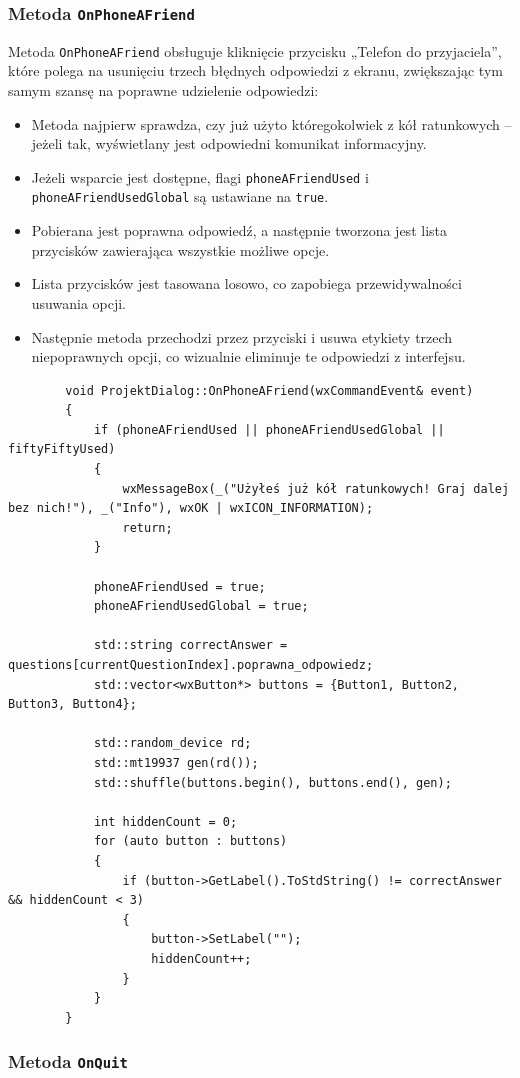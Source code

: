 \documentclass[]{article}
\begin{document}
\subsubsection{Metoda \texttt{OnPhoneAFriend}}

Metoda \texttt{OnPhoneAFriend} obsługuje kliknięcie przycisku „Telefon do przyjaciela”, które polega na usunięciu trzech błędnych odpowiedzi z ekranu, zwiększając tym samym szansę na poprawne udzielenie odpowiedzi:
\begin{itemize}
	\item Metoda najpierw sprawdza, czy już użyto któregokolwiek z kół ratunkowych – jeżeli tak, wyświetlany jest odpowiedni komunikat informacyjny.
	\item Jeżeli wsparcie jest dostępne, flagi \texttt{phoneAFriendUsed} i \texttt{phoneAFriendUsedGlobal} są ustawiane na \texttt{true}.
	\item Pobierana jest poprawna odpowiedź, a następnie tworzona jest lista przycisków zawierająca wszystkie możliwe opcje.
	\item Lista przycisków jest tasowana losowo, co zapobiega przewidywalności usuwania opcji.
	\item Następnie metoda przechodzi przez przyciski i usuwa etykiety trzech niepoprawnych opcji, co wizualnie eliminuje te odpowiedzi z interfejsu.
\end{itemize}

	
	\begin{verbatim}
		void ProjektDialog::OnPhoneAFriend(wxCommandEvent& event)
		{
			if (phoneAFriendUsed || phoneAFriendUsedGlobal || fiftyFiftyUsed)
			{
				wxMessageBox(_("Użyłeś już kół ratunkowych! Graj dalej bez nich!"), _("Info"), wxOK | wxICON_INFORMATION);
				return;
			}
			
			phoneAFriendUsed = true;
			phoneAFriendUsedGlobal = true;
			
			std::string correctAnswer = questions[currentQuestionIndex].poprawna_odpowiedz;
			std::vector<wxButton*> buttons = {Button1, Button2, Button3, Button4};
			
			std::random_device rd;
			std::mt19937 gen(rd());
			std::shuffle(buttons.begin(), buttons.end(), gen);
			
			int hiddenCount = 0;
			for (auto button : buttons)
			{
				if (button->GetLabel().ToStdString() != correctAnswer && hiddenCount < 3)
				{
					button->SetLabel("");
					hiddenCount++;
				}
			}
		}
	\end{verbatim}
\subsubsection{Metoda \texttt{OnQuit}}
\end{document}
